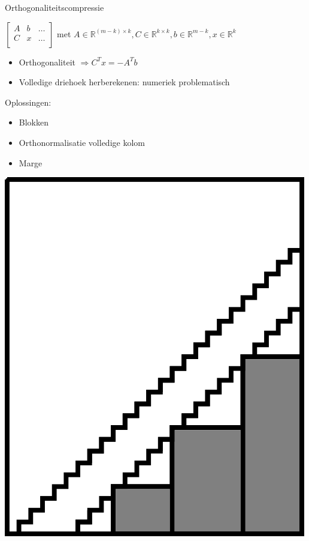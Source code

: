 \documentclass[t,12pt,dutch
\ifx\beamermode\undefined\else,\beamermode\fi
]{beamer}
\begin{document}
\begin{frame}{Orthogonaliteitscompressie}

\begin{center}
$
\begin{bmatrix}
A & b & \dots \\[0.3em]
C & x & \dots \\[0.3em]
\end{bmatrix}
$
met $A \in \mathbb{R}^{(m-k) \times k}, C \in \mathbb{R}^{k \times k}, b \in \mathbb{R}^{m - k}, x \in \mathbb{R}^{k}$
\end{center}

\begin{itemize}
\item Orthogonaliteit $\Rightarrow C^T x = -A^T b$
\item Volledige driehoek herberekenen: numeriek problematisch
\end{itemize}

\noindent\begin{minipage}{0.7\textwidth}%
Oplossingen:
\begin{itemize}
\item Blokken
\item Orthonormalisatie volledige kolom
\item Marge
\end{itemize}
\end{minipage}%
\hfill%
\begin{minipage}{0.3\textwidth}
\includegraphics[scale=0.8]{images/orthogonaliteitscompressie.png}
\end{minipage}

\end{frame}
\end{document}
